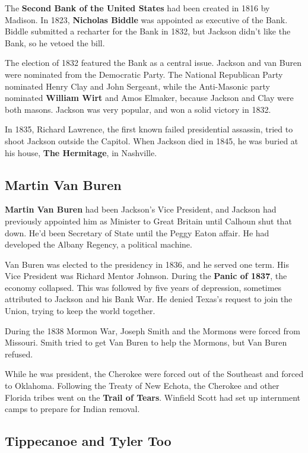 The \textbf{Second Bank of the United States} had been created in 1816 by Madison.
In 1823, \textbf{Nicholas Biddle} was appointed as executive of the Bank.
Biddle submitted a recharter for the Bank in 1832, but Jackson didn't like the Bank, so he vetoed the bill.

The election of 1832 featured the Bank as a central issue.
Jackson and van Buren were nominated from the Democratic Party.
The National Republican Party nominated Henry Clay and John Sergeant,
while the Anti-Masonic party nominated \textbf{William Wirt} and Amos Elmaker,
because Jackson and Clay were both masons.
Jackson was very popular, and won a solid victory in 1832.

In 1835, Richard Lawrence, the first known failed presidential assassin,
tried to shoot Jackson outside the Capitol.
When Jackson died in 1845, he was buried at his house, \textbf{The Hermitage}, in Nashville.

\subsection*{Martin Van Buren}
\textbf{Martin Van Buren} had been Jackson's Vice President,
and Jackson had previously appointed him as Minister to Great Britain until Calhoun shut that down.
He'd been Secretary of State until the Peggy Eaton affair.
He had developed the Albany Regency, a political machine.

Van Buren was elected to the presidency in 1836, and he served one term.
His Vice President was Richard Mentor Johnson.
During the \textbf{Panic of 1837}, the economy collapsed.
This was followed by five years of depression, sometimes attributed to Jackson and his Bank War.
He denied Texas's request to join the Union, trying to keep the world together.

During the 1838 Mormon War, Joseph Smith and the Mormons were forced from Missouri.
Smith tried to get Van Buren to help the Mormons, but Van Buren refused.

While he was president, the Cherokee were forced out of the Southeast and forced to Oklahoma.
Following the Treaty of New Echota, the Cherokee and other Florida tribes went on the \textbf{Trail of Tears}.
Winfield Scott had set up internment camps to prepare for Indian removal.


\subsection*{Tippecanoe and Tyler Too}

